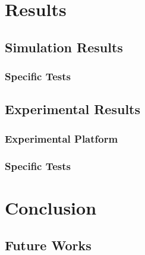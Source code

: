 \chapter{Results}
\label{cap:results}
\lhead{\textbf{\rightmark}}

\section{Simulation Results}
\label{sec:simulation_results}

\subsection{Specific Tests}
\label{subsec:simulation_tests}

\section{Experimental Results}
\label{sec:experimental_results}

\subsection{Experimental Platform}
\label{subsec:experimental_platform}

\subsection{Specific Tests}
\label{subsec:experimental_tests}

\chapter{Conclusion}
\label{cap:conclusion}
\lhead{\textbf{\rightmark}}

\section{Future Works}
\label{sec:future}